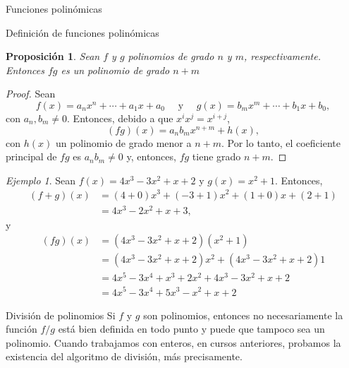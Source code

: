 \documentclass[a4paper,12pt,twoside,spanish,reqno]{amsbook}
\numberwithin{equation}{section}
\newtheorem{proposicion}[teorema]{Proposici\'on}
\theoremstyle{definition}
\theoremstyle{remark}
\newtheorem*{ejemplo*}{Ejemplo}
\begin{document}
\begin{chapter}{Funciones polinómicas}
\begin{section}{Definición de funciones polinómicas}
    \begin{proposicion}
        Sean $f$ y $g$ polinomios de grado $n$ y $m$,  respectivamente. Entonces $fg$ es un  polinomio de grado $n+m$
    \end{proposicion}
    \begin{proof}
        Sean 
        \begin{equation*}
        f(x) = a_nx^n + \cdots + a_1x +a_0 \quad\text{ y } \quad g(x) = b_mx^m +\cdots + b_1x +b_0,
        \end{equation*}
        con $a_n, b_m \ne 0$. Entonces, debido a que $x^ix^j = x^{i+j}$, 
        \begin{equation}
            (fg)(x) = a_nb_m x^{n+m} + h(x),
         \end{equation}
        con $h(x)$ un polinomio de grado menor a $n+m$. Por lo tanto, el coeficiente principal de $fg$ es $a_nb_m \ne 0$ y,  entonces, $fg$ tiene grado $n+m$.
    \end{proof}

    
        
    \begin{ejemplo*} Sean $f(x) = 4x^3 - 3x^2 + x + 2$ y $g(x) = x^2 + 1$. Entonces,
        \begin{align*}
            (f+g)(x) &= (4+0)x^3 +(-3 +1)x^2 + (1+0)x + (2+1)\\
            &= 4x^3 - 2x^2 + x + 3,
        \end{align*}
        y
        \begin{align*}
        (fg)(x) &= (4x^3 - 3x^2 + x + 2)(x^2 + 1)\\
        &= (4x^3 - 3x^2 + x + 2)x^2 + (4x^3 - 3x^2 + x + 2)1\\
        &= 4x^5 - 3x^4 + x^3 + 2x^2 + 4x^3 - 3x^2 + x + 2 \\
        &= 4x^5 - 3x^4 + 5x^3 - x^2 + x + 2
        \end{align*}
    \end{ejemplo*}
    

    \end{section}

    \begin{section}{División de polinomios}\label{seccion-division-de-polinomios} Si $f$ y $g$ son polinomios,  entonces no necesariamente la función $f/g$ está bien definida en todo punto y puede que tampoco sea un polinomio. Cuando trabajamos con enteros, en cursos anteriores,  probamos la existencia del algoritmo de división, más precisamente.
    

\end{section}
\end{chapter}
\end{document}

